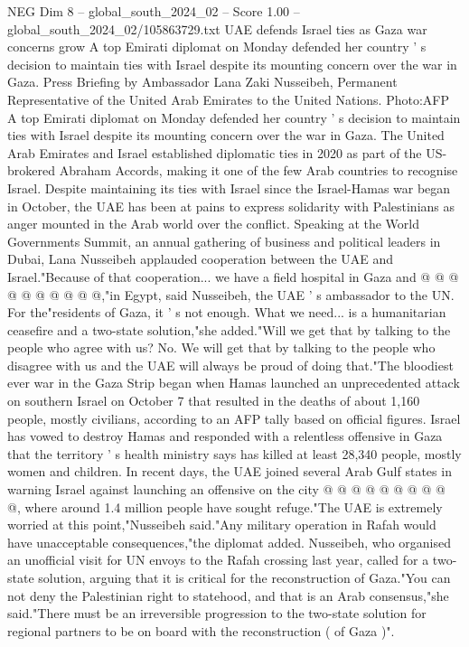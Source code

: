 \begin{textsample}{NEG Dim 8 – global\_south\_2024\_02 – Score 1.00 – global\_south\_2024\_02/105863729.txt}  \label{ex:f8_neg_256}
UAE defends Israel ties as Gaza war concerns grow A top Emirati diplomat on Monday defended her country ' s decision to maintain ties with Israel despite its mounting concern over the war in Gaza.
Press Briefing by Ambassador Lana Zaki Nusseibeh, Permanent Representative of the United Arab Emirates to the United Nations.
Photo:AFP A top Emirati diplomat on Monday defended her country ' s decision to maintain ties with Israel despite its mounting concern over the war in Gaza.
The United Arab Emirates and Israel established diplomatic ties in 2020 as part of the US-brokered Abraham Accords, making it one of the few Arab countries to recognise Israel.
Despite maintaining its ties with Israel since the Israel-Hamas war began in October, the UAE has been at pains to express solidarity with Palestinians as anger mounted in the Arab world over the conflict.
Speaking at the World Governments Summit, an annual gathering of business and political leaders in Dubai, Lana Nusseibeh applauded cooperation between the UAE and Israel."Because of that cooperation... we have a field hospital in Gaza and @ @ @ @ @ @ @ @ @ @,"in Egypt, said Nusseibeh, the UAE ' s ambassador to the UN.
For the"residents of Gaza, it ' s not enough.
What we need... is a humanitarian ceasefire and a two-state solution,"she added."Will we get that by talking to the people who agree with us?
No.
We will get that by talking to the people who disagree with us and the UAE will always be proud of doing that."The bloodiest ever war in the Gaza Strip began when Hamas launched an unprecedented attack on southern Israel on October 7 that resulted in the deaths of about 1,160 people, mostly civilians, according to an AFP tally based on official figures.
Israel has vowed to destroy Hamas and responded with a relentless offensive in Gaza that the territory ' s health ministry says has killed at least 28,340 people, mostly women and children.
In recent days, the UAE joined several Arab Gulf states in warning Israel against launching an offensive on the city @ @ @ @ @ @ @ @ @ @, where around 1.4 million people have sought refuge."The UAE is extremely worried at this point,"Nusseibeh said."Any military operation in Rafah would have unacceptable consequences,"the diplomat added.
Nusseibeh, who organised an unofficial visit for UN envoys to the Rafah crossing last year, called for a two-state solution, arguing that it is critical for the reconstruction of Gaza."You can not deny the Palestinian right to statehood, and that is an Arab consensus,"she said."There must be an irreversible progression to the two-state solution for regional partners to be on board with the reconstruction ( of Gaza )".

\end{textsample}
